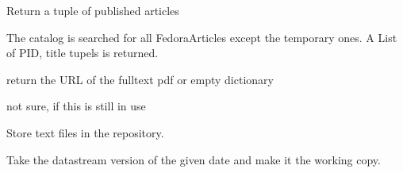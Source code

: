 \documentclass[a4paper,10pt,ngerman]{sphinxmanual}
\begin{document}
\begin{fulllineitems}
\begin{fulllineitems}
\label{contenttypen:Products.DiPP.content.fedoraarticle.FedoraArticle.getPublishedArticles}
Return a tuple of published articles

The catalog is searched for all FedoraArticles except the temporary ones.
A List of PID, title tupels is returned.

\end{fulllineitems}


\begin{fulllineitems}
\label{contenttypen:Products.DiPP.content.fedoraarticle.FedoraArticle.getFulltextPdf}
return the URL of the fulltext pdf or empty dictionary

\end{fulllineitems}


\begin{fulllineitems}
\label{contenttypen:Products.DiPP.content.fedoraarticle.FedoraArticle.linkTranslations}
not sure, if this is still in use

\end{fulllineitems}


\end{fulllineitems}


\begin{fulllineitems}
\label{contenttypen:Products.DiPP.content.fedoradocument.FedoraDocument}
Store text files in the repository.

\begin{fulllineitems}
\label{contenttypen:Products.DiPP.content.fedoradocument.FedoraDocument.make_working_copy}
Take the datastream version of the given date and make it the working copy.

\end{fulllineitems}


\end{fulllineitems}
\end{document}
